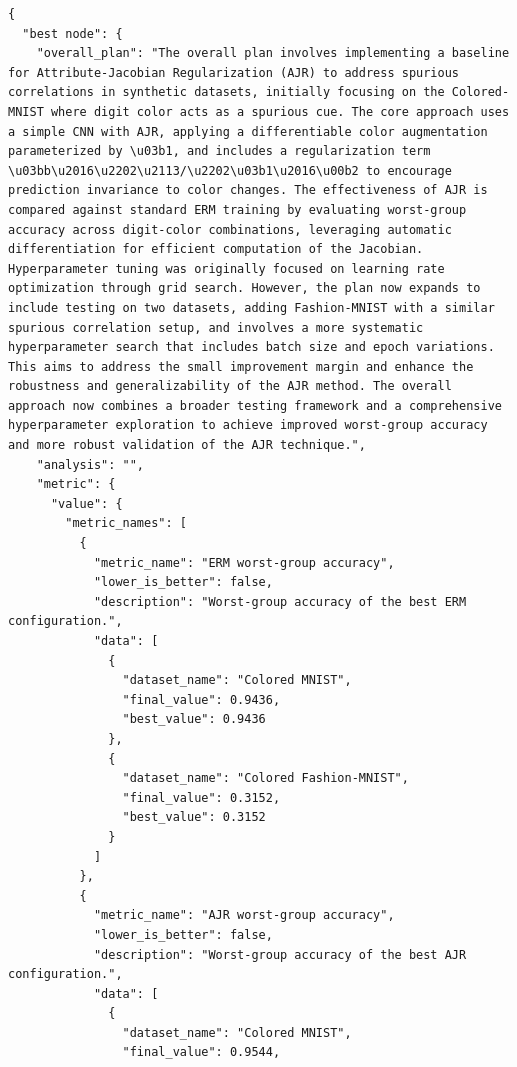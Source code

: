 \begin{appendices}
\begin{tcolorbox}[breakable, colback=orange!5!white, colframe=orange!80!black, title=Example Stage 2 summary]
\begin{Verbatim}[breaklines, breakafter={/,_,-,.}, breaksymbol={}, breaksymbolleft={}, fontsize=\small]
{
  "best node": {
    "overall_plan": "The overall plan involves implementing a baseline for Attribute-Jacobian Regularization (AJR) to address spurious correlations in synthetic datasets, initially focusing on the Colored-MNIST where digit color acts as a spurious cue. The core approach uses a simple CNN with AJR, applying a differentiable color augmentation parameterized by \u03b1, and includes a regularization term \u03bb\u2016\u2202\u2113/\u2202\u03b1\u2016\u00b2 to encourage prediction invariance to color changes. The effectiveness of AJR is compared against standard ERM training by evaluating worst-group accuracy across digit-color combinations, leveraging automatic differentiation for efficient computation of the Jacobian. Hyperparameter tuning was originally focused on learning rate optimization through grid search. However, the plan now expands to include testing on two datasets, adding Fashion-MNIST with a similar spurious correlation setup, and involves a more systematic hyperparameter search that includes batch size and epoch variations. This aims to address the small improvement margin and enhance the robustness and generalizability of the AJR method. The overall approach now combines a broader testing framework and a comprehensive hyperparameter exploration to achieve improved worst-group accuracy and more robust validation of the AJR technique.",
    "analysis": "",
    "metric": {
      "value": {
        "metric_names": [
          {
            "metric_name": "ERM worst-group accuracy",
            "lower_is_better": false,
            "description": "Worst-group accuracy of the best ERM configuration.",
            "data": [
              {
                "dataset_name": "Colored MNIST",
                "final_value": 0.9436,
                "best_value": 0.9436
              },
              {
                "dataset_name": "Colored Fashion-MNIST",
                "final_value": 0.3152,
                "best_value": 0.3152
              }
            ]
          },
          {
            "metric_name": "AJR worst-group accuracy",
            "lower_is_better": false,
            "description": "Worst-group accuracy of the best AJR configuration.",
            "data": [
              {
                "dataset_name": "Colored MNIST",
                "final_value": 0.9544,

\end{Verbatim}
\end{tcolorbox}
\end{appendices}

